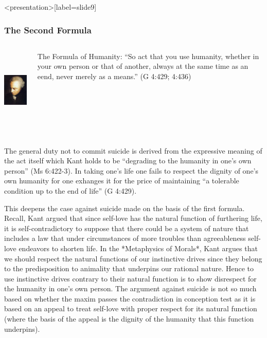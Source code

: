 \begin{frame}<presentation>[label=slide9]
    \frametitle{The Second Formula}
        \begin{columns}
            \begin{column}{3cm}
                \includegraphics[height=4cm]{../../../graphics/kant.jpg}
            \end{column}
            \begin{column}{7cm}
                \alert{The Formula of Humanity}: ``So act that you use humanity, whether in your own person or that of another, always at the same time as an eend, never merely as a means.'' (G 4:429; 4:436)
            \end{column}
        \end{columns}
\end{frame}



The general duty not to commit suicide is derived from the expressive meaning of the act itself which Kant holds to be ``degrading to the humanity in one’s own person'' (Ms 6:422-3). In taking one’s life one fails to respect the dignity of one’s own humanity for one exhanges it for the price of maintaining ``a tolerable condition up to the end of life'' (G 4:429).

This deepens the case against suicide made on the basis of the first formula. Recall, Kant argued that since self-love has the natural function of furthering life, it is self-contradictory to suppose that there could be a system of nature that includes a law that under circumstances of more troubles than agreeableness self-love endeavors to shorten life. In the *Metaphysics of Morals*, Kant argues that we should respect the natural functions of our instinctive drives since they belong to the predisposition to animality that underpins our rational nature. Hence to use instinctive drives contrary to their natural function is to show disrespect for the humanity in one’s own person. The argument against suicide is not so much based on whether the maxim passes the contradiction in conception test as it is based on an appeal to treat self-love with proper respect for its natural function (where the basis of the appeal is the dignity of the humanity that this function underpins). \change

